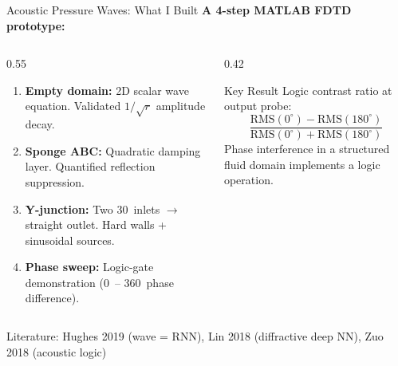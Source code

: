 \documentclass[aspectratio=169,11pt]{beamer}
\begin{document}
\begin{frame}{Acoustic Pressure Waves: What I Built}
  \textbf{A 4-step MATLAB FDTD prototype:}

  \vspace{0.2cm}
  \begin{columns}[T]
    \begin{column}{0.55\textwidth}
      \footnotesize
      \begin{enumerate}
        \item \textbf{Empty domain:} 2D scalar wave equation. Validated $1/\sqrt{r}$ amplitude decay.
        \item \textbf{Sponge ABC:} Quadratic damping layer. Quantified reflection suppression.
        \item \textbf{Y-junction:} Two 30\textdegree\ inlets $\rightarrow$ straight outlet. Hard walls + sinusoidal sources.
        \item \textbf{Phase sweep:} Logic-gate demonstration (0\textdegree\ -- 360\textdegree\ phase difference).
      \end{enumerate}
    \end{column}
    \begin{column}{0.42\textwidth}
      \begin{block}{\footnotesize Key Result}
        \footnotesize
        Logic contrast ratio at output probe:
        \[
          \frac{\text{RMS}(0^\circ) - \text{RMS}(180^\circ)}{\text{RMS}(0^\circ) + \text{RMS}(180^\circ)}
        \]
        Phase interference in a structured fluid domain implements a logic operation.
      \end{block}
    \end{column}
  \end{columns}

  \vspace{0.3cm}
  \textcolor{gdpDarkBlue}{\small Literature: Hughes 2019 (wave = RNN), Lin 2018 (diffractive deep NN), Zuo 2018 (acoustic logic)}
\end{frame}
\end{document}
